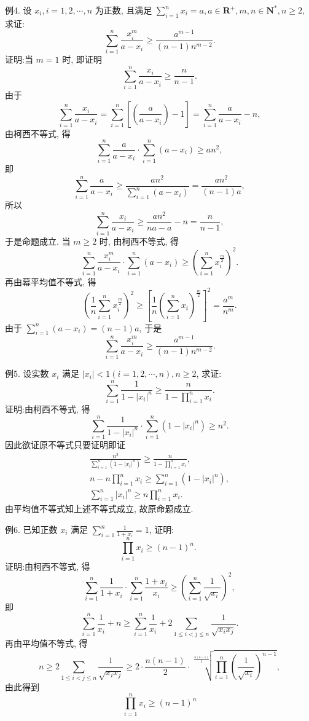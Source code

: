 例4. 设 $x_i, i=1,2, \cdots, n$ 为正数, 且满足 $\sum_{i=1}^n x_i=a, a \in \mathbf{R}^{+}, m, n \in \mathbf{N}^*, n \geqslant 2$, 求证:
$$
\sum_{i=1}^n \frac{x_i^m}{a-x_i} \geqslant \frac{a^{m-1}}{(n-1) n^{m-2}} .
$$
证明:当 $m=1$ 时, 即证明
$$
\sum_{i=1}^n \frac{x_i}{a-x_i} \geqslant \frac{n}{n-1} .
$$
由于
$$
\sum_{i=1}^n \frac{x_i}{a-x_i}=\sum_{i=1}^n\left[\left(\frac{a}{a-x_i}\right)-1\right]=\sum_{i=1}^n \frac{a}{a-x_i}-n,
$$
由柯西不等式, 得
$$
\sum_{i=1}^n \frac{a}{a-x_i} \cdot \sum_{i=1}^n\left(a-x_i\right) \geqslant a n^2,
$$
即
$$
\sum_{i=1}^n \frac{a}{a-x_i} \geqslant \frac{a n^2}{\sum_{i=1}^n\left(a-x_i\right)}=\frac{a n^2}{(n-1) a},
$$
所以
$$
\sum_{i=1}^n \frac{x_i}{a-x_i} \geqslant \frac{a n^2}{n a-a}-n=\frac{n}{n-1},
$$
于是命题成立.
当 $m \geqslant 2$ 时, 由柯西不等式, 得
$$
\sum_{i=1}^n \frac{x_i^m}{a-x_i} \cdot \sum_{i=1}^n\left(a-x_i\right) \geqslant\left(\sum_{i=1}^n x_i^{\frac{m}{2}}\right)^2 .
$$
再由幕平均值不等式, 得
$$
\left(\frac{1}{n} \sum_{i=1}^n x_i^{\frac{m}{2}}\right)^2 \geqslant\left[\frac{1}{n}\left(\sum_{i=1}^n x_i\right)^{\frac{m}{2}}\right]^2=\frac{a^m}{n^m} .
$$
由于 $\sum_{i=1}^n\left(a-x_i\right)=(n-1) a$, 于是
$$
\sum_{i=1}^n \frac{x_i^m}{a-x_i} \geqslant \frac{a^{m-1}}{(n-1) n^{m-2}} .
$$



例5. 设实数 $x_i$ 满足 $\left|x_i\right|<1(i=1,2, \cdots, n), n \geqslant 2$, 求证:
$$
\sum_{i=1}^n \frac{1}{1-\left|x_i\right|^n} \geqslant \frac{n}{1-\prod_{i=1}^n x_i} .
$$
证明:由柯西不等式, 得
$$
\sum_{i=1}^n \frac{1}{1-\left|x_i\right|^n} \cdot \sum_{i=1}^n\left(1-\left|x_i\right|^n\right) \geqslant n^2 .
$$
因此欲证原不等式只要证明即证
$$
\begin{gathered}
\frac{n^2}{\sum_{i=1}^n\left(1-\left|x_i\right|^n\right)} \geqslant \frac{n}{1-\prod_{i=1}^n x_i}, \\
n-n \prod_{i=1}^n x_i \geqslant \sum_{i=1}^n\left(1-\left|x_i\right|^n\right), \\
\sum_{i=1}^n\left|x_i\right|^n \geqslant n \prod_{i=1}^n x_i .
\end{gathered}
$$
由平均值不等式知上述不等式成立, 故原命题成立.



例6. 已知正数 $x_i$ 满足 $\sum_{i=1}^n \frac{1}{1+x_i}=1$, 证明:
$$
\prod_{i=1}^n x_i \geqslant(n-1)^n \text {. }
$$
证明:由柯西不等式, 得
$$
\sum_{i=1}^n \frac{1}{1+x_i} \cdot \sum_{i=1}^n \frac{1+x_i}{x_i} \geqslant\left(\sum_{i=1}^n \frac{1}{\sqrt{x_i}}\right)^2,
$$
即
$$
\sum_{i=1}^n \frac{1}{x_i}+n \geqslant \sum_{i=1}^n \frac{1}{x_i}+2 \sum_{1 \leqslant i<j \leqslant n} \frac{1}{\sqrt{x_i x_j}} .
$$
再由平均值不等式, 得
$$
n \geqslant 2 \sum_{1 \leqslant i<j \leqslant n} \frac{1}{\sqrt{x_i x_j}} \geqslant 2 \cdot \frac{n(n-1)}{2} \cdot \sqrt[\frac{n(n-1)}{2}]{\prod_{i=1}^n\left(\frac{1}{\sqrt{x_i}}\right)^{n-1}},
$$
由此得到
$$
\prod_{i=1}^n x_i \geqslant(n-1)^n
$$



